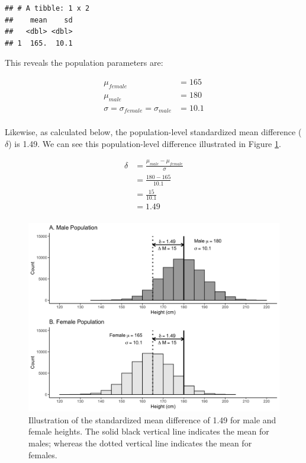 \documentclass[
]{krantz}
\makeatletter
\newenvironment{Shaded}{\begin{snugshade}}{\end{snugshade}}
\newcommand{\DataTypeTok}[1]{\textcolor[rgb]{0.27,0.27,0.27}{#1}}
\newcommand{\KeywordTok}[1]{\textcolor[rgb]{0.27,0.27,0.27}{\textbf{#1}}}
\newcommand{\NormalTok}[1]{#1}
\newcommand{\OperatorTok}[1]{\textcolor[rgb]{0.43,0.43,0.43}{\textbf{#1}}}
\newcommand{\StringTok}[1]{\textcolor[rgb]{0.5,0.5,0.5}{#1}}
\newenvironment{kframe}{%
\medskip{}
\setlength{\fboxsep}{.8em}
 \def\at@end@of@kframe{}%
 \ifinner\ifhmode%
  \def\at@end@of@kframe{\end{minipage}}%
  \begin{minipage}{\columnwidth}%
 \fi\fi%
 \def\FrameCommand##1{\hskip\@totalleftmargin \hskip-\fboxsep
 \colorbox{shadecolor}{##1}\hskip-\fboxsep
     \hskip-\linewidth \hskip-\@totalleftmargin \hskip\columnwidth}%
 \MakeFramed {\advance\hsize-\width
   \@totalleftmargin\z@ \linewidth\hsize
   \@setminipage}}%
 {\par\unskip\endMakeFramed%
 \at@end@of@kframe}
\renewenvironment{Shaded}{\begin{kframe}}{\end{kframe}}
\makeatother
\begin{document}
\begin{Shaded}
\end{Shaded}

\begin{verbatim}
## # A tibble: 1 x 2
##    mean    sd
##   <dbl> <dbl>
## 1  165.  10.1
\end{verbatim}

This reveals the population parameters are:

\[
\begin{aligned} 
\mu_{female} &= 165 \\
\mu_{male} &= 180 \\
\sigma = \sigma_{female} = \sigma_{male} &= 10.1\\
\end{aligned} 
\]

Likewise, as calculated below, the population-level standardized mean difference (\(\delta\)) is 1.49. We can see this population-level difference illustrated in Figure \ref{fig:sexpop}.

\[
\begin{aligned} 
\delta  &= \frac{\mu_{male} - \mu_{female}}{\sigma} \\
&= \frac{180 - 165}{10.1} \\
&= \frac{15}{10.1} \\
&= 1.49 \\
\end{aligned} 
\]

\begin{figure}
\includegraphics[width=0.95\linewidth]{ch_samples/images/sex_pops} \caption[Illustration of standardized mean difference of $\delta =1.49$]{Illustration of the standardized mean difference of 1.49 for male and female heights. The solid black vertical line indicates the mean for males; whereas the dotted vertical line indicates the mean for females.}\label{fig:sexpop}
\end{figure}
\end{document}
